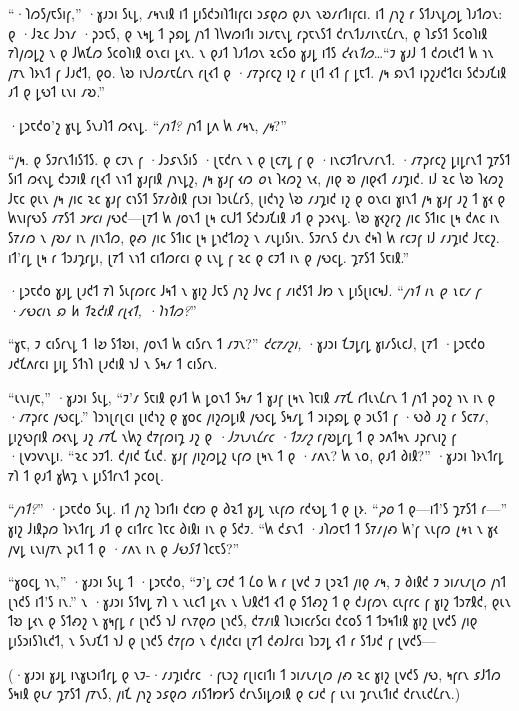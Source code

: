 “·𐑐𐑼𐑕𐑢𐑱𐑕𐑦𐑝,” ·𐑣𐑨𐑮𐑦 𐑕𐑧𐑛, 𐑥𐑰𐑯𐑦𐑙 𐑦𐑑 𐑛𐑦𐑕𐑒𐑮𐑦𐑐𐑑𐑦𐑝𐑤𐑦 𐑮𐑭𐑞𐑼 𐑞𐑨𐑯 𐑯𐑹𐑥𐑩𐑑𐑦𐑝𐑤𐑦. 𐑦𐑑 𐑢𐑪𐑟 𐑩 𐑕𐑑𐑨𐑯𐑛𐑼𐑛 𐑐𐑨𐑑𐑼𐑯: 𐑞 ·𐑓𐑷𐑤 𐑓𐑮𐑪𐑥 ·𐑜𐑮𐑱𐑕, 𐑞 𐑯𐑰𐑛 𐑑 𐑜𐑸𐑛 𐑢𐑪𐑑 𐑐𐑘𐑫𐑼𐑦𐑑𐑦 𐑮𐑦𐑥𐑱𐑯𐑛 𐑩𐑜𐑱𐑯𐑕𐑑 𐑒𐑩𐑯𐑑𐑨𐑥𐑦𐑯𐑱𐑖𐑩𐑯, 𐑞 𐑐𐑭𐑕𐑑 𐑕𐑤𐑴𐑐𐑦𐑙 𐑳𐑐𐑢𐑼𐑛𐑟 𐑯 𐑞 𐑓𐑿𐑗𐑼 𐑕𐑤𐑴𐑐𐑦𐑙 𐑴𐑯𐑤𐑦 𐑛𐑬𐑯. 𐑯 𐑞𐑨𐑑 𐑐𐑨𐑑𐑼𐑯 𐑷𐑤𐑕𐑴 𐑣𐑨𐑛 𐑦𐑑𐑕 \emph{𐑒𐑬𐑯𐑑𐑼}…“𐑲 𐑣𐑨𐑓 𐑑 𐑒𐑼𐑧𐑒𐑑 𐑿 𐑪𐑯 𐑢𐑳𐑯 𐑐𐑶𐑯𐑑 𐑝 𐑓𐑨𐑒𐑑, 𐑞𐑴. 𐑘𐑹 𐑦𐑯𐑓𐑼𐑥𐑱𐑖𐑩𐑯 𐑩𐑚𐑬𐑑 𐑞 ·𐑥𐑳𐑜𐑩𐑤𐑟 𐑦𐑟 𐑩 𐑚𐑦𐑑 𐑬𐑑 𐑝 𐑛𐑱𐑑. 𐑢𐑰 𐑸𐑯𐑑 𐑦𐑜𐑟𐑨𐑒𐑑𐑤𐑦 𐑕𐑒𐑮𐑨𐑗𐑦𐑙 𐑨𐑑 𐑞 𐑛𐑻𐑑 𐑧𐑯𐑦 𐑥𐑹.”

·𐑛𐑮𐑱𐑒𐑴'𐑟 𐑣𐑧𐑛 𐑕𐑯𐑨𐑐𐑑 𐑼𐑬𐑯𐑛. “\emph{𐑢𐑪𐑑?} 𐑢𐑪𐑑 𐑛𐑵 𐑿 𐑥𐑰𐑯, \emph{𐑢𐑰}?”

“𐑢𐑰. 𐑞 𐑕𐑲𐑩𐑯𐑑𐑦𐑕𐑑𐑕. 𐑞 𐑤𐑲𐑯 𐑝 ·𐑓𐑮𐑭𐑯𐑕𐑦𐑕 ·𐑚𐑱𐑒𐑩𐑯 𐑯 𐑞 𐑚𐑤𐑳𐑛 𐑝 𐑞 ·𐑦𐑯𐑤𐑲𐑑𐑩𐑯𐑥𐑩𐑯𐑑. ·𐑥𐑳𐑜𐑩𐑤𐑟 𐑛𐑦𐑛𐑩𐑯𐑑 𐑡𐑳𐑕𐑑 𐑕𐑦𐑑 𐑼𐑬𐑯𐑛 𐑒𐑮𐑲𐑦𐑙 𐑩𐑚𐑬𐑑 𐑯𐑪𐑑 𐑣𐑨𐑝𐑦𐑙 𐑢𐑪𐑯𐑛𐑟, 𐑢𐑰 𐑣𐑨𐑝 𐑬𐑼 \emph{𐑴𐑯} 𐑐𐑬𐑼𐑟 𐑯𐑬, 𐑢𐑦𐑞 𐑹 𐑢𐑦𐑞𐑬𐑑 𐑥𐑨𐑡𐑦𐑒. 𐑦𐑓 𐑷𐑤 𐑘𐑹 𐑐𐑬𐑼𐑟 𐑓𐑱𐑤 𐑞𐑧𐑯 𐑢𐑰 𐑢𐑦𐑤 𐑷𐑤 𐑣𐑨𐑝 𐑤𐑪𐑕𐑑 𐑕𐑳𐑥𐑔𐑦𐑙 𐑝𐑧𐑮𐑦 𐑐𐑮𐑧𐑖𐑩𐑕, 𐑚𐑦𐑒𐑪𐑟 𐑘𐑹 𐑥𐑨𐑡𐑦𐑒 𐑦𐑟 𐑞 𐑴𐑯𐑤𐑦 𐑣𐑦𐑯𐑑 𐑢𐑰 𐑣𐑨𐑝 𐑨𐑟 𐑑 𐑣𐑬 𐑞 𐑿𐑯𐑦𐑝𐑻𐑕 𐑥𐑳𐑕𐑑 \emph{𐑮𐑾𐑤𐑦} 𐑢𐑻𐑒—𐑚𐑳𐑑 𐑿 𐑢𐑴𐑯𐑑 𐑚𐑰 𐑤𐑧𐑓𐑑 𐑕𐑒𐑮𐑨𐑗𐑦𐑙 𐑨𐑑 𐑞 𐑜𐑮𐑬𐑯𐑛. 𐑘𐑹 𐑣𐑬𐑟𐑩𐑟 𐑢𐑦𐑤 𐑕𐑑𐑦𐑤 𐑚𐑰 𐑒𐑵𐑤 𐑦𐑯 𐑕𐑳𐑥𐑼 𐑯 𐑢𐑹𐑥 𐑦𐑯 𐑢𐑦𐑯𐑑𐑼, 𐑞𐑺 𐑢𐑦𐑤 𐑕𐑑𐑦𐑤 𐑚𐑰 𐑛𐑪𐑒𐑑𐑼𐑟 𐑯 𐑥𐑧𐑛𐑦𐑕𐑦𐑯. 𐑕𐑲𐑩𐑯𐑕 𐑒𐑨𐑯 𐑒𐑰𐑐 𐑿 𐑩𐑤𐑲𐑝 𐑦𐑓 𐑥𐑨𐑡𐑦𐑒 𐑓𐑱𐑤𐑟. 𐑦𐑑'𐑩𐑛 𐑚𐑰 𐑩 𐑑𐑮𐑨𐑡𐑩𐑛𐑦, 𐑚𐑳𐑑 𐑯𐑪𐑑 𐑤𐑦𐑑𐑼𐑩𐑤𐑦 𐑞 𐑧𐑯𐑛 𐑝 𐑷𐑤 𐑞 𐑤𐑲𐑑 𐑦𐑯 𐑞 𐑢𐑻𐑤𐑛. 𐑡𐑳𐑕𐑑 𐑕𐑱𐑦𐑙.”

·𐑛𐑮𐑱𐑒𐑴 𐑣𐑨𐑛 𐑚𐑨𐑒𐑑 𐑳𐑐 𐑕𐑧𐑝𐑼𐑩𐑤 𐑓𐑰𐑑 𐑯 𐑣𐑦𐑟 𐑓𐑱𐑕 𐑢𐑪𐑟 𐑓𐑫𐑤 𐑝 𐑥𐑦𐑒𐑕𐑑 𐑓𐑽 𐑯 𐑛𐑦𐑕𐑚𐑦𐑤𐑰𐑓. “\emph{𐑢𐑪𐑑 𐑦𐑯 𐑞 𐑯𐑱𐑥 𐑝 ·𐑥𐑻𐑤𐑦𐑯 𐑸 𐑿 𐑑𐑷𐑒𐑦𐑙 𐑩𐑚𐑬𐑑, ·𐑐𐑪𐑑𐑼?}”

“𐑣𐑱, 𐑲 𐑤𐑦𐑕𐑩𐑯𐑛 𐑑 \emph{𐑘𐑹} 𐑕𐑑𐑹𐑦, 𐑢𐑴𐑯𐑑 𐑿 𐑤𐑦𐑕𐑩𐑯 𐑑 𐑥𐑲𐑯?” \emph{𐑒𐑤𐑳𐑥𐑟𐑦,} ·𐑣𐑨𐑮𐑦 𐑗𐑲𐑛𐑩𐑛 𐑣𐑦𐑥𐑕𐑧𐑤𐑓, 𐑚𐑳𐑑 ·𐑛𐑮𐑱𐑒𐑴 𐑨𐑒𐑗𐑵𐑩𐑤𐑦 𐑛𐑦𐑛 𐑕𐑑𐑪𐑐 𐑚𐑨𐑒𐑦𐑙 𐑪𐑓 𐑯 𐑕𐑰𐑥 𐑑 𐑤𐑦𐑕𐑩𐑯.

“𐑧𐑯𐑦𐑢𐑱,” ·𐑣𐑨𐑮𐑦 𐑕𐑧𐑛, “𐑲'𐑥 𐑕𐑱𐑦𐑙 𐑞𐑨𐑑 𐑿 𐑛𐑴𐑯𐑑 𐑕𐑰𐑥 𐑑 𐑣𐑨𐑝 𐑚𐑰𐑯 𐑐𐑱𐑦𐑙 𐑥𐑳𐑗 𐑩𐑑𐑧𐑯𐑖𐑩𐑯 𐑑 𐑢𐑪𐑑 𐑜𐑴𐑟 𐑪𐑯 𐑦𐑯 𐑞 ·𐑥𐑳𐑜𐑩𐑤 𐑢𐑻𐑤𐑛.” 𐑐𐑮𐑪𐑚𐑩𐑚𐑤𐑦 𐑚𐑦𐑒𐑪𐑟 𐑞 𐑣𐑴𐑤 𐑢𐑦𐑟𐑼𐑛𐑦𐑙 𐑢𐑻𐑤𐑛 𐑕𐑰𐑥𐑛 𐑑 𐑮𐑦𐑜𐑸𐑛 𐑞 𐑮𐑧𐑕𐑑 𐑝 ·𐑻𐑔 𐑨𐑟 𐑩 𐑕𐑤𐑳𐑥, 𐑛𐑦𐑟𐑻𐑝𐑦𐑙 𐑼𐑬𐑯𐑛 𐑨𐑟 𐑥𐑳𐑗 𐑯𐑿𐑟 𐑒𐑳𐑝𐑼𐑦𐑡 𐑨𐑟 𐑞 \emph{·𐑓𐑲𐑯𐑨𐑯𐑖𐑩𐑤 ·𐑑𐑲𐑥𐑟} 𐑩𐑢𐑹𐑛𐑩𐑛 𐑑 𐑞 𐑮𐑵𐑑𐑰𐑯 𐑨𐑜𐑩𐑯𐑦𐑟 𐑝 ·𐑚𐑫𐑮𐑫𐑯𐑛𐑦. “𐑷𐑤 𐑮𐑲𐑑. 𐑒𐑢𐑦𐑒 𐑗𐑧𐑒. 𐑣𐑨𐑝 𐑢𐑦𐑟𐑼𐑛𐑟 𐑧𐑝𐑼 𐑚𐑰𐑯 𐑑 𐑞 ·𐑥𐑵𐑯? 𐑿 𐑯𐑴, 𐑞𐑨𐑑 𐑔𐑦𐑙?” ·𐑣𐑨𐑮𐑦 𐑐𐑶𐑯𐑑𐑩𐑛 𐑳𐑐 𐑑 𐑞𐑨𐑑 𐑣𐑿𐑡 𐑯 𐑛𐑦𐑕𐑑𐑩𐑯𐑑 𐑜𐑤𐑴𐑚.

“\emph{𐑢𐑪𐑑?}” ·𐑛𐑮𐑱𐑒𐑴 𐑕𐑧𐑛. 𐑦𐑑 𐑢𐑪𐑟 𐑐𐑮𐑦𐑑𐑦 𐑒𐑤𐑽 𐑞 𐑔𐑷𐑑 𐑣𐑨𐑛 𐑯𐑧𐑝𐑼 𐑩𐑒𐑻𐑛 𐑑 𐑞 𐑚𐑶. “\emph{𐑜𐑴} 𐑑 𐑞—𐑦𐑑'𐑕 𐑡𐑳𐑕𐑑 𐑩—” 𐑣𐑦𐑟 𐑓𐑦𐑙𐑜𐑼 𐑐𐑶𐑯𐑑𐑩𐑛 𐑨𐑑 𐑞 𐑤𐑦𐑑𐑩𐑤 𐑐𐑱𐑤 𐑔𐑦𐑙𐑦 𐑦𐑯 𐑞 𐑕𐑒𐑲. “𐑿 𐑒𐑭𐑯𐑑 ·𐑨𐑐𐑼𐑱𐑑 𐑑 𐑕𐑳𐑥𐑢𐑺 𐑿'𐑝 𐑯𐑧𐑝𐑼 \emph{𐑚𐑰𐑯} 𐑯 𐑣𐑬 𐑢𐑫𐑛 𐑧𐑯𐑦𐑢𐑳𐑯 𐑜𐑧𐑑 𐑑 𐑞 ·𐑥𐑵𐑯 𐑦𐑯 𐑞 \emph{𐑓𐑻𐑕𐑑} 𐑐𐑤𐑱𐑕?”

“𐑣𐑴𐑤𐑛 𐑪𐑯,” ·𐑣𐑨𐑮𐑦 𐑕𐑧𐑛 𐑑 ·𐑛𐑮𐑱𐑒𐑴, “𐑲'𐑛 𐑤𐑲𐑒 𐑑 𐑖𐑴 𐑿 𐑩 𐑚𐑫𐑒 𐑲 𐑚𐑮𐑷𐑑 𐑢𐑦𐑞 𐑥𐑰, 𐑲 𐑔𐑦𐑙𐑒 𐑲 𐑮𐑦𐑥𐑧𐑥𐑚𐑼 𐑢𐑪𐑑 𐑚𐑪𐑒𐑕 𐑦𐑑'𐑕 𐑦𐑯.” 𐑯 ·𐑣𐑨𐑮𐑦 𐑕𐑑𐑫𐑛 𐑳𐑐 𐑯 𐑯𐑧𐑤𐑑 𐑛𐑬𐑯 𐑯 𐑘𐑨𐑙𐑒𐑑 𐑬𐑑 𐑞 𐑕𐑑𐑺𐑟 𐑑 𐑞 𐑒𐑨𐑝𐑼𐑯 𐑤𐑧𐑝𐑩𐑤 𐑝 𐑣𐑦𐑟 𐑑𐑮𐑳𐑙𐑒, 𐑞𐑧𐑯 𐑑𐑹 𐑛𐑬𐑯 𐑞 𐑕𐑑𐑺𐑟 𐑯 𐑣𐑰𐑝𐑛 𐑩 𐑚𐑪𐑒𐑕 𐑪𐑓 𐑩𐑯𐑳𐑞𐑼 𐑚𐑪𐑒𐑕, 𐑒𐑳𐑥𐑦𐑙 𐑐𐑧𐑮𐑦𐑤𐑩𐑕𐑤𐑦 𐑒𐑤𐑴𐑕 𐑑 𐑑𐑮𐑰𐑑𐑦𐑙 𐑣𐑦𐑟 𐑚𐑫𐑒𐑕 𐑢𐑦𐑞 𐑛𐑦𐑕𐑮𐑦𐑕𐑐𐑧𐑒𐑑, 𐑯 𐑕𐑯𐑨𐑗𐑑 𐑪𐑓 𐑞 𐑚𐑪𐑒𐑕 𐑒𐑳𐑝𐑼 𐑯 𐑒𐑢𐑦𐑒𐑤𐑦 𐑚𐑳𐑑 𐑒𐑺𐑓𐑩𐑤𐑦 𐑐𐑮𐑲𐑛 𐑬𐑑 𐑩 𐑕𐑑𐑨𐑒 𐑝 𐑚𐑫𐑒𐑕—

(·𐑣𐑨𐑮𐑦 𐑣𐑨𐑛 𐑦𐑯𐑣𐑧𐑮𐑦𐑑𐑩𐑛 𐑞 𐑯𐑲-·𐑥𐑨𐑡𐑦𐑒𐑩𐑤 ·𐑝𐑧𐑮𐑟 𐑩𐑚𐑦𐑤𐑦𐑑𐑦 𐑑 𐑮𐑦𐑥𐑧𐑥𐑚𐑼 𐑢𐑺 𐑷𐑤 𐑣𐑦𐑟 𐑚𐑫𐑒𐑕 𐑢𐑻, 𐑰𐑝𐑩𐑯 𐑭𐑓𐑑𐑼 𐑕𐑰𐑦𐑙 𐑞𐑧𐑥 𐑡𐑳𐑕𐑑 𐑢𐑳𐑯𐑕, 𐑢𐑦𐑗 𐑢𐑪𐑟 𐑮𐑭𐑞𐑼 𐑥𐑦𐑕𐑑𐑽𐑾𐑕 𐑒𐑩𐑯𐑕𐑦𐑛𐑼𐑦𐑙 𐑞 𐑤𐑨𐑒 𐑝 𐑧𐑯𐑦 𐑡𐑩𐑯𐑧𐑑𐑦𐑒 𐑒𐑩𐑯𐑧𐑒𐑖𐑩𐑯.)


